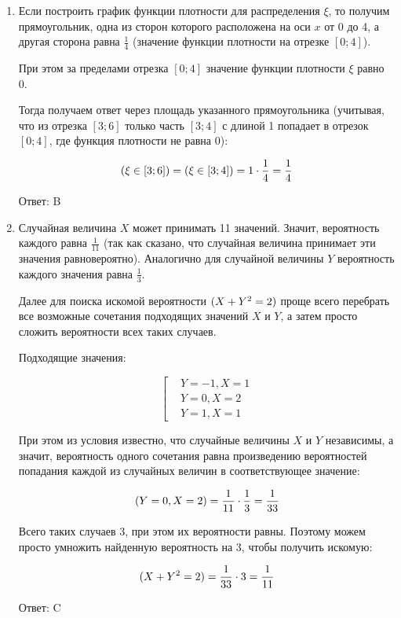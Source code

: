 \documentclass[11pt, a4paper]{article}
\let\P\relax
\DeclareMathOperator{\P}{\mathbb{P}}
\theoremstyle{definition}
\begin{document}
\begin{enumerate}
	\item 	
	
	Если построить график функции плотности для распределения $\xi$, то получим прямоугольник, одна из сторон которого расположена на оси $x$ от 0 до 4, а другая сторона равна $\frac{1}{4}$ (значение функции плотности на отрезке $[0;4]$). 
	
	При этом за пределами отрезка $[0;4]$ значение функции плотности $\xi$ равно 0.
	
	Тогда получаем ответ через площадь указанного прямоугольника (учитывая, что из отрезка $[3;6]$ только часть $[3;4]$ с длиной 1 попадает в отрезок $[0;4]$, где функция плотности не равна 0):
	
	\[
	\P(\xi \in [3;6])=\P(\xi \in [3;4])=1\cdot \frac{1}{4}=\frac{1}{4}
	\]
	
	Ответ: B
	
	\item 
	
	Случайная величина $X$ может принимать 11 значений. 
	Значит, вероятность каждого равна $\frac{1}{11}$ (так как сказано, что случайная величина принимает эти значения равновероятно). 
	Аналогично для случайной величины $Y$ вероятность каждого значения равна $\frac{1}{3}$.
	
	Далее для поиска искомой вероятности $\P(X+Y^2 = 2)$ проще всего перебрать все возможные сочетания подходящих значений $X$ и $Y$, а затем просто сложить вероятности всех таких случаев. 
	
	Подходящие значения:
	
	\[\left[
	\begin{aligned}
	&Y=-1, X=1\\
	&Y=0, X=2\\
	&Y=1, X=1
	\end{aligned}
	\right.
	\]
	
	При этом из условия известно, что случайные величины $X$ и $Y$ независимы, а значит, вероятность одного сочетания равна произведению вероятностей попадания каждой из случайных величин в соответствующее значение:
	
	\[
	\P(Y=0, X=2)=\frac{1}{11}\cdot \frac{1}{3}=\frac{1}{33}
	\]
	
	Всего таких случаев 3, при этом их вероятности равны. 
	Поэтому можем просто умножить найденную вероятность на 3, чтобы получить искомую:
	
	\[
	\P(X+Y^2 = 2) = \frac{1}{33}\cdot 3=\frac{1}{11}
	\]
	
	Ответ: C	
	

\end{enumerate}
\end{document}
